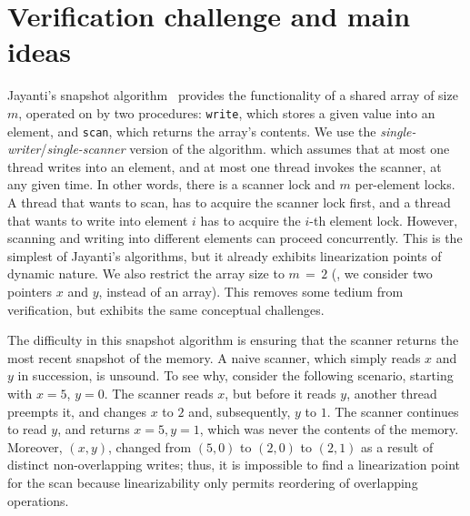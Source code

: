 


\newcommand{\fx}{\mathit{fx}}
\newcommand{\fy}{\mathit{fy}}
\newcommand{\x}{x}
\newcommand{\y}{y}
\newcommand{\s}{S}



\newcommand{\jywrite}{\texttt{write}\xspace}
\newcommand{\jyscan}{\texttt{scan}\xspace}

\section{Verification challenge and main ideas}
\label{sc:overview}


Jayanti's snapshot algorithm~\cite{Jayanti+STOC05} provides the
functionality of a shared array of size $m$, operated on by two
procedures: \jywrite, which stores a given value into an element, and
\jyscan, which returns the array's contents. We use the
\emph{single-writer}/\emph{single-scanner} version of the algorithm.
which assumes that at most one thread writes into an element, and at
most one thread invokes the scanner, at any given time. In other
words, there is a scanner lock and $m$ per-element locks. A thread
that wants to scan, has to acquire the scanner lock first, and a
thread that wants to write into element $i$ has to acquire the $i$-th
element lock. However, scanning and writing into different elements
can proceed concurrently.
% 
This is the simplest of Jayanti's algorithms, but it already exhibits
linearization points of dynamic nature. We also restrict the array
size to $m\,{=}\,2$ (\ie, we consider two pointers $\x$ and $\y$,
instead of an array). This removes some tedium from verification, but
exhibits the same conceptual challenges.
 
The difficulty in this snapshot algorithm is ensuring that the scanner
returns the most recent snapshot of the memory. A naive scanner, which
simply reads $\x$ and $\y$ in succession, is unsound. To see why,
consider the following scenario, starting with $\x=5$, $\y=0$. The
scanner reads $\x$, but before it reads $\y$, another thread preempts
it, and changes $\x$ to $2$ and, subsequently, $\y$ to $1$. The
scanner continues to read $\y$, and returns $\x=5, \y=1$, which was
never the contents of the memory. Moreover, $(\x, \y)$, changed from
$(5,0)$ to $(2, 0)$ to $(2, 1)$ as a result of distinct
non-overlapping writes; thus, it is impossible to find a linearization
point for the scan because linearizability only permits reordering of
overlapping operations.

